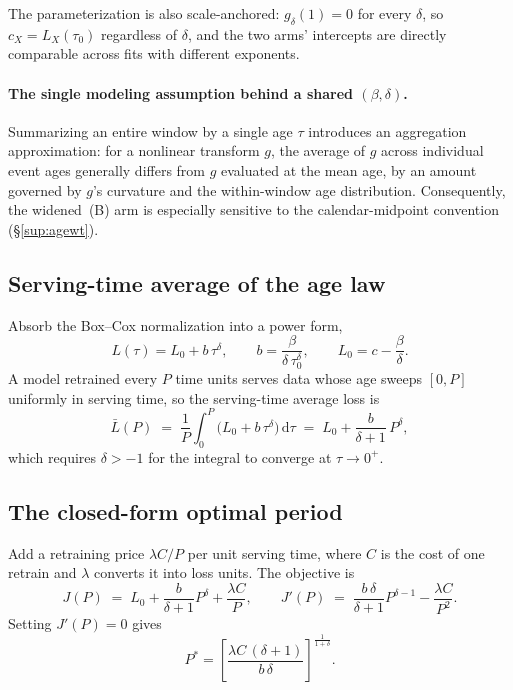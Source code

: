\documentclass[10pt,letterpaper]{article}
\begin{document}
The parameterization is also scale-anchored: $g_\delta(1) = 0$ for every
$\delta$, so $c_X = L_X(\tau_0)$ regardless of $\delta$, and the two arms'
intercepts are directly comparable across fits with different exponents.

\paragraph{The single modeling assumption behind a shared $(\beta,\delta)$.}
Summarizing an entire window by a single age $\tau$ introduces an aggregation
approximation: for a nonlinear transform $g$, the average of $g$ across
individual event ages generally differs from $g$ evaluated at the mean age, by
an amount governed by $g$'s curvature and the within-window age distribution.
Consequently, the widened~(B) arm is especially sensitive to the
calendar-midpoint convention (\S\ref{sup:agewt}).

\subsection{Serving-time average of the age law}

Absorb the Box--Cox normalization into a power form,
\[
L(\tau) = L_0 + b\,\tau^{\delta}, \qquad
b = \frac{\beta}{\delta\,\tau_0^{\delta}}, \qquad
L_0 = c - \frac{\beta}{\delta} .
\]
A model retrained every $P$ time units serves data whose age sweeps
$[0, P]$ uniformly in serving time, so the serving-time average loss is
\begin{equation}
\bar L(P) \;=\; \frac{1}{P}\int_0^{P} \! \big(L_0 + b\,\tau^{\delta}\big)\,
\mathrm{d}\tau
\;=\; L_0 + \frac{b}{\delta+1}\,P^{\delta},
\label{eq:lbar}
\end{equation}
which requires $\delta > -1$ for the integral to converge at $\tau \to 0^+$.

\subsection{The closed-form optimal period}

Add a retraining price $\lambda C / P$ per unit serving time, where $C$ is
the cost of one retrain and $\lambda$ converts it into loss units. The
objective is
\[
J(P) \;=\; L_0 + \frac{b}{\delta+1}P^{\delta} + \frac{\lambda C}{P},
\qquad
J'(P) \;=\; \frac{b\,\delta}{\delta+1}P^{\delta-1} - \frac{\lambda C}{P^{2}} .
\]
Setting $J'(P) = 0$ gives
\begin{equation}
P^{\ast} = \left[ \frac{\lambda C\,(\delta+1)}{b\,\delta}
\right]^{\frac{1}{1+\delta}} .
\label{eq:pstar}
\end{equation}
\end{document}
